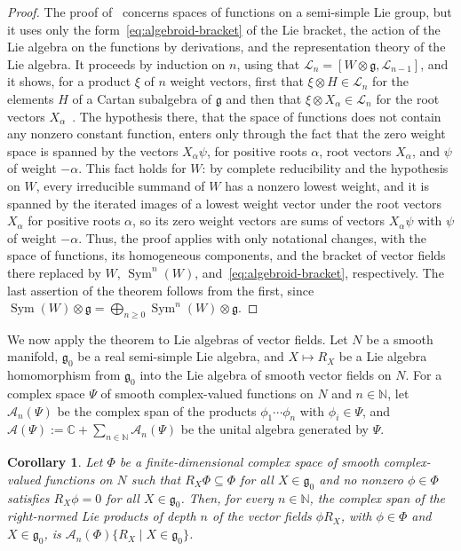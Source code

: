 \documentclass{article}
\newcommand{\N}{\mathbb{N}}
\newcommand{\C}{\mathbb{C}}
\newcommand{\frakg}{\mathfrak{g}}
\newcommand{\cL}{\mathcal{L}}
\newcommand{\Sym}{\operatorname{Sym}}
\newtheorem{corollary}[theorem]{Corollary}
\theoremstyle{definition}
\theoremstyle{plain}
\begin{document}
\begin{proof}

The proof of~\cite[Theorem~1]{CofD3gen} concerns spaces of functions on a semi-simple Lie group, but it uses only the form~\eqref{eq:algebroid-bracket} of the Lie bracket, the action of the Lie algebra on the functions by derivations, and the representation theory of the Lie algebra.
It proceeds by induction on $n$, using that $\cL_n=[W\otimes\frakg,\cL_{n-1}]$, and it shows, for a product $\xi$ of $n$ weight vectors, first that $\xi\otimes H\in\cL_n$ for the elements $H$ of a Cartan subalgebra of $\frakg$ and then that $\xi\otimes X_\alpha\in\cL_n$ for the root vectors $X_\alpha$~\cite[Section~2, Propositions~2--5]{CofD3gen}.
The hypothesis there, that the space of functions does not contain any nonzero constant function, enters only through the fact that the zero weight space is spanned by the vectors $X_\alpha\psi$, for positive roots $\alpha$, root vectors $X_\alpha$, and $\psi$ of weight $-\alpha$.
This fact holds for $W$: by complete reducibility and the hypothesis on $W$, every irreducible summand of $W$ has a nonzero lowest weight, and it is spanned by the iterated images of a lowest weight vector under the root vectors $X_\alpha$ for positive roots $\alpha$, so its zero weight vectors are sums of vectors $X_\alpha\psi$ with $\psi$ of weight $-\alpha$.
Thus, the proof applies with only notational changes, with the space of functions, its homogeneous components,
    and the bracket of vector fields there replaced by $W$, $\Sym^n(W)$, and~\eqref{eq:algebroid-bracket}, respectively.
The last assertion of the theorem follows from the first, since $\Sym(W)\otimes\frakg=\bigoplus_{n\geq0}\Sym^n(W)\otimes\frakg$.
\end{proof}


We now apply the theorem to Lie algebras of vector fields.
Let $N$ be a smooth manifold, $\frakg_0$ be a real semi-simple Lie algebra, and $X\mapsto R_X$ be a Lie algebra homomorphism from $\frakg_0$ into the Lie algebra of smooth vector fields on $N$.
For a complex space $\Psi$ of smooth complex-valued functions on $N$ and $n\in\N$, let $\mathcal A_n(\Psi)$ be the complex span of the products $\phi_1\cdots\phi_n$ with $\phi_i\in\Psi$, and $\mathcal A(\Psi):=\C+\sum_{n\in\N}\mathcal A_n(\Psi)$ be the unital algebra generated by $\Psi$.

\begin{corollary}\label{cor:udg}
Let $\Phi$ be a finite-dimensional complex space of smooth complex-valued functions on $N$ such that $R_X\Phi\subseteq\Phi$ for all $X\in\frakg_0$ and no nonzero $\phi\in\Phi$ satisfies $R_X\phi=0$ for all $X\in\frakg_0$.
Then, for every $n\in\N$, the complex span of the right-normed Lie products of depth $n$ of the vector fields $\phi R_X$, with $\phi\in\Phi$ and $X\in\frakg_0$, is $\mathcal A_n(\Phi)\{R_X\mid X\in\frakg_0\}$.
\end{corollary}
\end{document}
